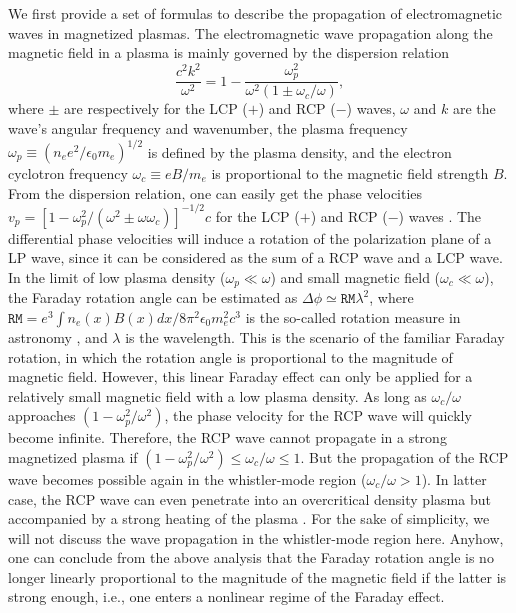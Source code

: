 \documentclass[%
aps,
preprint,
showpacs,
preprintnumbers,
 amsmath,
 amssymb,
 prl,
]{revtex4-1}
\begin{document}
We first provide a set of formulas to describe the propagation of electromagnetic waves in magnetized plasmas.
The electromagnetic wave propagation along the magnetic field in a plasma is mainly governed by the dispersion relation \cite{Chen}
\begin{equation}
\frac{c^2k^2}{\omega^2}  = 1- \frac{\omega_p^2}{ \omega^2  (1 \pm \omega_c/\omega)},
\end{equation}
where $\pm$ are respectively for the LCP ($+$) and RCP ($-$) waves, $\omega$ and $k$ are the wave's angular frequency and wavenumber, the plasma frequency $\omega_p\equiv (n_e e^2/\epsilon_0 m_e)^{1/2}$ is defined by the plasma density, and the electron cyclotron frequency $\omega_c\equiv eB/m_e$ is proportional to the magnetic field strength $B$.
From the dispersion relation, one can easily get the phase velocities $v_{p} = [1-\omega_p^2/(\omega^2 \pm \omega \omega_c)]^{-1/2} c$ for the LCP ($+$) and RCP ($-$) waves \cite{Chen}.
The differential phase velocities will induce a rotation of the polarization plane of a LP wave, since it can be considered as the sum of a RCP wave and a LCP wave.
In the limit of low plasma density ($\omega_p \ll \omega $) and small magnetic field ($\omega_c \ll \omega $), the Faraday rotation angle can be estimated as $\Delta \phi \simeq  \texttt{RM} \lambda^2 $,
where $\texttt{RM}=e^3\int n_e(x) B(x) dx/8\pi^2\epsilon_0 m_e^2 c^3$ is the so-called rotation measure in astronomy \cite{Klein,Brandenburg}, and $\lambda$ is the wavelength.
This is the scenario of the familiar Faraday rotation, in which the rotation angle is proportional to the magnitude of magnetic field.
However, this linear Faraday effect can only be applied for a relatively small magnetic field with a low plasma density.
As long as $\omega_c/\omega$ approaches $(1-\omega_p^2/\omega^2)$, the phase velocity for the RCP wave will quickly become infinite. Therefore, the RCP wave cannot propagate in a strong magnetized plasma if $(1-\omega_p^2/\omega^2) \leq \omega_c/\omega \leq 1$.
But the propagation of the RCP wave becomes possible again in the whistler-mode region ($\omega_c/\omega > 1$). In latter case,  the RCP wave can even penetrate into an overcritical density plasma but accompanied by a strong heating of the plasma \cite{YangAPL}.
For the sake of simplicity, we will not discuss the wave propagation in the whistler-mode region here.
Anyhow, one can conclude from the above analysis that the Faraday rotation angle is no longer linearly proportional to the magnitude of the magnetic field if the latter is strong enough, i.e., one enters a nonlinear regime of the Faraday effect.
\end{document}
